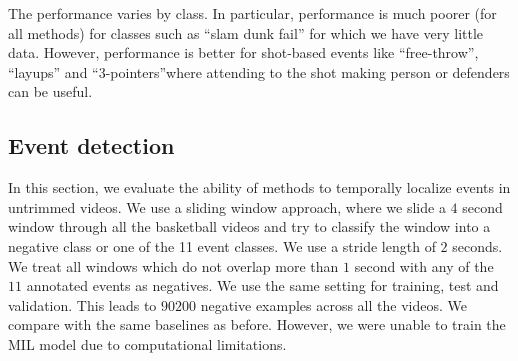 The performance varies by class.
In particular, performance is much poorer (for all methods) for classes
such as ``slam dunk fail'' for which we have very little data.
However, performance is better for shot-based events like
``free-throw'', ``layups'' and ``3-pointers''where attending to
the shot making person or defenders can be useful. 

\subsection{Event detection}

In this section, we evaluate the ability of methods to temporally localize
events in untrimmed videos.  We use a sliding window approach, where we slide a
$4$ second window through all the basketball videos and try to classify the
window into a negative class or one of the 11 event classes. We use a stride
length of $2$ seconds.  We treat all windows which do not overlap more than $1$
second with any of the $11$ annotated events as negatives. We use the same setting
for training, test and validation.  This leads to $90200$ negative examples
across all the videos.  We compare with the same baselines as before. However,
we were unable to train the MIL model due to computational limitations.

